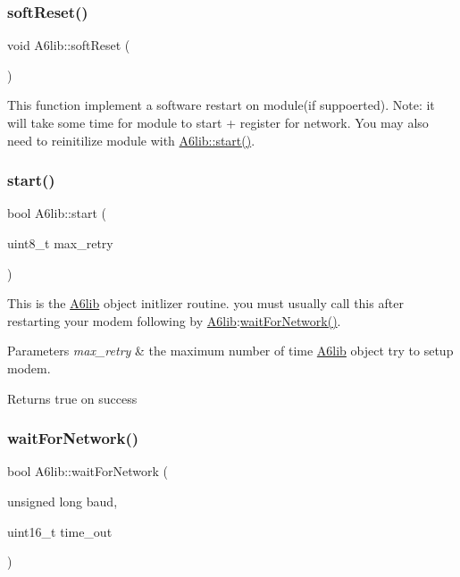 \mbox{\label{class_a6lib_a8b64136d0c8aba6af51568ff93a5455e}} 
\subsubsection{\texorpdfstring{soft\+Reset()}{softReset()}}
{\footnotesize\ttfamily void A6lib\+::soft\+Reset (\begin{DoxyParamCaption}{ }\end{DoxyParamCaption})}

This function implement a software restart on module(if suppoerted). Note\+: it will take some time for module to start + register for network. You may also need to reinitilize module with \mbox{\hyperlink{class_a6lib_a811c9dfff81c0a4fbdbc9ce824ad83d3}{A6lib\+::start()}}. \mbox{\label{class_a6lib_a811c9dfff81c0a4fbdbc9ce824ad83d3}} 
\subsubsection{\texorpdfstring{start()}{start()}}
{\footnotesize\ttfamily bool A6lib\+::start (\begin{DoxyParamCaption}\item[{uint8\+\_\+t}]{max\+\_\+retry }\end{DoxyParamCaption})}

This is the \mbox{\hyperlink{class_a6lib}{A6lib}} object initlizer routine. you must usually call this after restarting your modem following by \mbox{\hyperlink{class_a6lib}{A6lib}}\+:\mbox{\hyperlink{class_a6lib_a47499c54e5e1f117d45ee733d85ea9e4}{wait\+For\+Network()}}. 
\begin{DoxyParams}{Parameters}
{\em max\+\_\+retry} & the maximum number of time \mbox{\hyperlink{class_a6lib}{A6lib}} object try to setup modem. \\
\hline
\end{DoxyParams}
\begin{DoxyReturn}{Returns}
true on success 
\end{DoxyReturn}
\mbox{\label{class_a6lib_a47499c54e5e1f117d45ee733d85ea9e4}} 
\subsubsection{\texorpdfstring{wait\+For\+Network()}{waitForNetwork()}}
{\footnotesize\ttfamily bool A6lib\+::wait\+For\+Network (\begin{DoxyParamCaption}\item[{unsigned long}]{baud,  }\item[{uint16\+\_\+t}]{time\+\_\+out }\end{DoxyParamCaption})}

